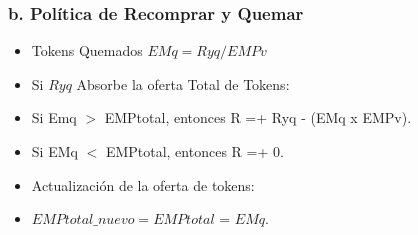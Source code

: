 \documentclass{article}
\begin{document}
\subsubsection*{b. Política de Recomprar y Quemar}
\begin{itemize}
    \item Tokens Quemados $EMq = Ryq/EMPv$ 
    \item Si $Ryq$ Absorbe la oferta Total de Tokens: 
    \item Si Emq $>$ EMPtotal, entonces R =+ Ryq - (EMq x EMPv).
    \item Si EMq $<$ EMPtotal, entonces R =+ 0.    
    \item Actualización de la oferta de tokens:
    \item $EMPtotal\_nuevo = EMPtotal$ = $EMq$. 
\end{itemize}
\end{document}
